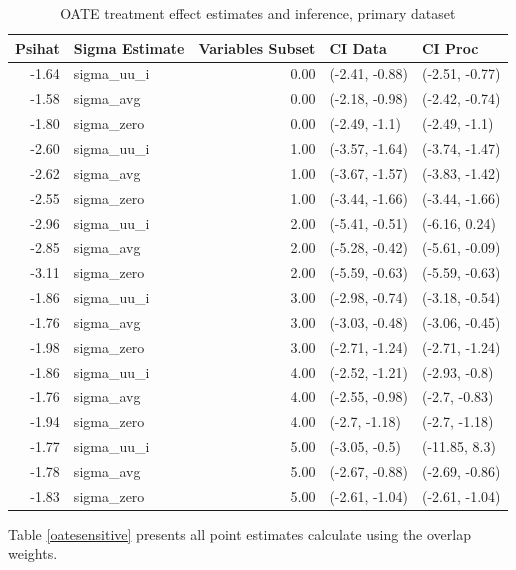 \documentclass[12pt]{article}
\begin{document}
\begin{table}[ht]
\centering
\begin{tabular}{rlrll}
  \hline
Psihat & Sigma Estimate & Variables Subset & CI Data & CI Proc \\ 
  \hline
-1.64 & sigma\_uu\_i & 0.00 & (-2.41, -0.88) & (-2.51, -0.77) \\ 
  -1.58 & sigma\_avg & 0.00 & (-2.18, -0.98) & (-2.42, -0.74) \\ 
  -1.80 & sigma\_zero & 0.00 & (-2.49, -1.1) & (-2.49, -1.1) \\ 
  -2.60 & sigma\_uu\_i & 1.00 & (-3.57, -1.64) & (-3.74, -1.47) \\ 
  -2.62 & sigma\_avg & 1.00 & (-3.67, -1.57) & (-3.83, -1.42) \\ 
  -2.55 & sigma\_zero & 1.00 & (-3.44, -1.66) & (-3.44, -1.66) \\ 
  -2.96 & sigma\_uu\_i & 2.00 & (-5.41, -0.51) & (-6.16, 0.24) \\ 
  -2.85 & sigma\_avg & 2.00 & (-5.28, -0.42) & (-5.61, -0.09) \\ 
  -3.11 & sigma\_zero & 2.00 & (-5.59, -0.63) & (-5.59, -0.63) \\ 
  -1.86 & sigma\_uu\_i & 3.00 & (-2.98, -0.74) & (-3.18, -0.54) \\ 
  -1.76 & sigma\_avg & 3.00 & (-3.03, -0.48) & (-3.06, -0.45) \\ 
  -1.98 & sigma\_zero & 3.00 & (-2.71, -1.24) & (-2.71, -1.24) \\ 
  -1.86 & sigma\_uu\_i & 4.00 & (-2.52, -1.21) & (-2.93, -0.8) \\ 
  -1.76 & sigma\_avg & 4.00 & (-2.55, -0.98) & (-2.7, -0.83) \\ 
  -1.94 & sigma\_zero & 4.00 & (-2.7, -1.18) & (-2.7, -1.18) \\ 
  -1.77 & sigma\_uu\_i & 5.00 & (-3.05, -0.5) & (-11.85, 8.3) \\ 
  -1.78 & sigma\_avg & 5.00 & (-2.67, -0.88) & (-2.69, -0.86) \\ 
  -1.83 & sigma\_zero & 5.00 & (-2.61, -1.04) & (-2.61, -1.04) \\ 
   \hline
\end{tabular}
   \caption{OATE treatment effect estimates and inference, primary dataset}
   \label{oateprimary}
\end{table}



Table \ref{oatesensitive} presents all point estimates calculate using the overlap weights.
\end{document}
